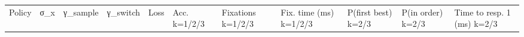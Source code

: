 \documentclass[10pt,letterpaper]{article}
\begin{document}
\begin{longtable}[]{@{}
  >{\raggedright\arraybackslash}p{}
  >{\raggedright\arraybackslash}p{}
  >{\raggedright\arraybackslash}p{}
  >{\raggedright\arraybackslash}p{}
  >{\raggedright\arraybackslash}p{}
  >{\raggedright\arraybackslash}p{}
  >{\raggedright\arraybackslash}p{}
  >{\raggedright\arraybackslash}p{}
  >{\raggedright\arraybackslash}p{}
  >{\raggedright\arraybackslash}p{}
  >{\raggedright\arraybackslash}p{}@{}}
\toprule\noalign{}
\begin{minipage}[b]{\linewidth}\raggedright
Policy
\end{minipage} & \begin{minipage}[b]{\linewidth}\raggedright
σ\_x
\end{minipage} & \begin{minipage}[b]{\linewidth}\raggedright
γ\_sample
\end{minipage} & \begin{minipage}[b]{\linewidth}\raggedright
γ\_switch
\end{minipage} & \begin{minipage}[b]{\linewidth}\raggedright
Loss
\end{minipage} & \begin{minipage}[b]{\linewidth}\raggedright
Acc. k=1/2/3
\end{minipage} & \begin{minipage}[b]{\linewidth}\raggedright
Fixations k=1/2/3
\end{minipage} & \begin{minipage}[b]{\linewidth}\raggedright
Fix. time (ms) k=1/2/3
\end{minipage} & \begin{minipage}[b]{\linewidth}\raggedright
P(first best) k=2/3
\end{minipage} & \begin{minipage}[b]{\linewidth}\raggedright
P(in order) k=2/3
\end{minipage} & \begin{minipage}[b]{\linewidth}\raggedright
Time to resp. 1 (ms) k=2/3

\end{minipage}
\end{longtable}
\end{document}
